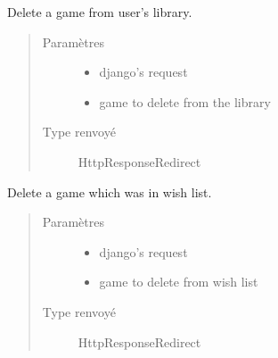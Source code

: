\documentclass[letterpaper,10pt,french]{sphinxmanual}
\begin{document}

\begin{fulllineitems}
\label{\detokenize{library:library.views.delete_from_library}}
Delete a game from user’s library.
\begin{quote}\begin{description}
\item[{Paramètres}] \leavevmode\begin{itemize}
\item {}
 \textendash{} django’s request

\item {}
 \textendash{} game to delete from the library

\end{itemize}

\item[{Type renvoyé}] \leavevmode
HttpResponseRedirect

\end{description}\end{quote}

\end{fulllineitems}


\begin{fulllineitems}
\label{\detokenize{library:library.views.delete_wish}}
Delete a game which was in wish list.
\begin{quote}\begin{description}
\item[{Paramètres}] \leavevmode\begin{itemize}
\item {}
 \textendash{} django’s request

\item {}
 \textendash{} game to delete from wish list

\end{itemize}

\item[{Type renvoyé}] \leavevmode
HttpResponseRedirect

\end{description}\end{quote}

\end{fulllineitems}
\end{document}
